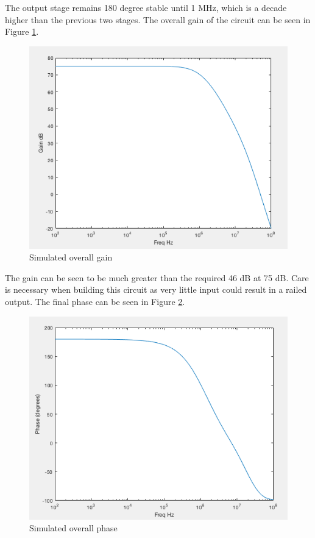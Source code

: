 The output stage remains 180 degree stable until 1 MHz, which is a decade higher than the previous two stages. The overall gain of the circuit can be seen in Figure \ref{fig:overallgain}. 

\begin{figure}[H]
	\begin{center}
		\includegraphics[scale=.40]{Simulations/gain_overall.png}
		\caption{Simulated overall gain}
		\label{fig:overallgain}
	\end{center}
\end{figure} 

The gain can be seen to be much greater than the required 46 dB at 75 dB. Care is necessary when building this circuit as very little input could result in a railed output. The final phase can be seen in Figure \ref{fig:overallphase}.


\begin{figure}[H]
	\begin{center}
		\includegraphics[scale=.40]{Simulations/phaseoverall.png}
		\caption{Simulated overall phase}
		\label{fig:overallphase}
	\end{center}
\end{figure} 

